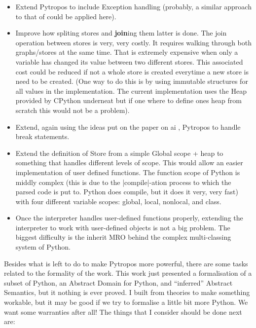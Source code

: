 \begin{itemize}
\tightlist
\item
  Extend Pytropos to include Exception handling (probably, a similar
  approach to that of {} could be
  applied here).
\item
  Improve how spliting stores and \textbf{join}ing them latter is
  done. The join operation between stores is very, very costly. It
  requires walking through both graphs/stores at the same time. That is
  extremely expensive when only a variable has changed its value between
  two different stores. This associated cost could be reduced if not a
  whole store is created everytime a new store is need to be created.
  (One way to do this is by using immutable structures for all values in
  the implementation. The current implementation uses the Heap provided
  by CPython underneat but if one where to define ones heap from scratch
  this would not be a problem).
\item
  Extend, again using the ideas put on the paper on ai {}, Pytropos to handle break statements.
\item
  Extend the definition of Store from a simple Global scope + heap to
  something that handles different levels of scope. This would allow an
  easier implementation of user defined functions. The function scope of
  Python is middly complex (this is due to the \pycode|compile|-ation
  process to which the parsed code is put to. Python does compile, but
  it does it very, very fast) with four different variable scopes:
  global, local, nonlocal, and class.
\item
  Once the interpreter handles user-defined functions properly,
  extending the interpreter to work with user-defined objects is not a
  big problem. The biggest difficulty is the inherit MRO behind the
  complex multi-classing system of Python.
\end{itemize}

{} {}

Besides what is left to do to make Pytropos more powerful, there are
some tasks related to the formality of the work. This work just
presented a formalisation of a subset of Python, an Abstract Domain for
Python, and \enquote{inferred} Abstract Semantics, but it nothing is
ever proved. I built from theories to make something workable, but it
may be good if we try to formalise a little bit more Python. We want
some warranties after all! The things that I consider should be done
next are:

